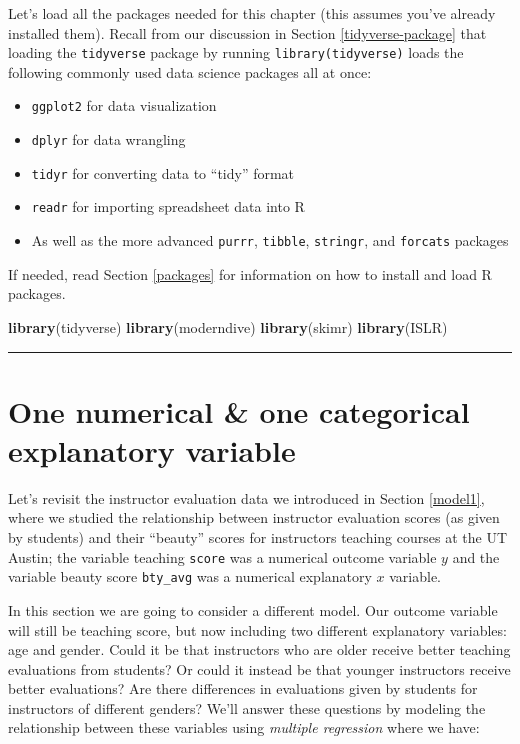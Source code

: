 \documentclass[12pt, krantz2,]{krantz}
\makeatletter
\newenvironment{Shaded}{\begin{snugshade}}{\end{snugshade}}
\newcommand{\KeywordTok}[1]{\textcolor[rgb]{0.27,0.27,0.27}{\textbf{#1}}}
\newcommand{\NormalTok}[1]{#1}
\providecommand{\tightlist}{%
  \setlength{\itemsep}{0pt}\setlength{\parskip}{0pt}}
\newenvironment{kframe}{%
\medskip{}
\setlength{\fboxsep}{.8em}
 \def\at@end@of@kframe{}%
 \ifinner\ifhmode%
  \def\at@end@of@kframe{\end{minipage}}%
  \begin{minipage}{\columnwidth}%
 \fi\fi%
 \def\FrameCommand##1{\hskip\@totalleftmargin \hskip-\fboxsep
 \colorbox{shadecolor}{##1}\hskip-\fboxsep
     \hskip-\linewidth \hskip-\@totalleftmargin \hskip\columnwidth}%
 \MakeFramed {\advance\hsize-\width
   \@totalleftmargin\z@ \linewidth\hsize
   \@setminipage}}%
 {\par\unskip\endMakeFramed%
 \at@end@of@kframe}
\renewenvironment{Shaded}{\begin{kframe}}{\end{kframe}}
\makeatother
\begin{document}
Let's load all the packages needed for this chapter (this assumes you've already installed them). Recall from our discussion in Section \ref{tidyverse-package} that loading the \texttt{tidyverse} package by running \texttt{library(tidyverse)} loads the following commonly used data science packages all at once:

\begin{itemize}
\tightlist
\item
  \texttt{ggplot2} for data visualization
\item
  \texttt{dplyr} for data wrangling
\item
  \texttt{tidyr} for converting data to ``tidy'' format
\item
  \texttt{readr} for importing spreadsheet data into R
\item
  As well as the more advanced \texttt{purrr}, \texttt{tibble}, \texttt{stringr}, and \texttt{forcats} packages
\end{itemize}

If needed, read Section \ref{packages} for information on how to install and load R packages.

\begin{Shaded}
\begin{Highlighting}[]
\KeywordTok{library}\NormalTok{(tidyverse)}
\KeywordTok{library}\NormalTok{(moderndive)}
\KeywordTok{library}\NormalTok{(skimr)}
\KeywordTok{library}\NormalTok{(ISLR)}
\end{Highlighting}
\end{Shaded}

\begin{center}\rule{0.5\linewidth}{\linethickness}\end{center}

\hypertarget{model4}{%
\section{One numerical \& one categorical explanatory variable}\label{model4}}

Let's revisit the instructor evaluation data we introduced in Section \ref{model1}, where we studied the relationship between instructor evaluation scores (as given by students) and their ``beauty'' scores for instructors teaching courses at the UT Austin; the variable teaching \texttt{score} was a numerical outcome variable \(y\) and the variable beauty score \texttt{bty\_avg} was a numerical explanatory \(x\) variable.

In this section we are going to consider a different model. Our outcome variable will still be teaching score, but now including two different explanatory variables: age and gender. Could it be that instructors who are older receive better teaching evaluations from students? Or could it instead be that younger instructors receive better evaluations? Are there differences in evaluations given by students for instructors of different genders? We'll answer these questions by modeling the relationship between these variables using \emph{multiple regression} where we have:
\end{document}
